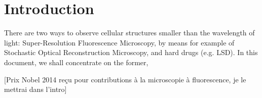 \section{Introduction}
There are two ways to observe cellular structures smaller than the wavelength of light:
Super-Resolution Fluorescence Microscopy, by means for example of Stochastic Optical Reconstruction Microscopy, and hard drugs (e.g. LSD).
In this document, we shall concentrate on the former,

[Prix Nobel 2014 reçu pour contributions à la microscopie à fluorescence, je le mettrai dans l'intro]
